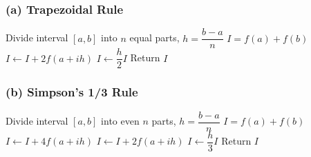 \subsubsection*{(a) Trapezoidal Rule}
\begin{algorithm}[H]
\caption{Trapezoidal Rule}
\begin{algorithmic}[1]
\STATE Divide interval $[a,b]$ into $n$ equal parts, $h=\dfrac{b-a}{n}$
\STATE $I = f(a) + f(b)$
    \STATE $I \gets I + 2f(a+ih)$
\ENDFOR
\STATE $I \gets \dfrac{h}{2} I$
\STATE Return $I$
\end{algorithmic}
\end{algorithm}

\subsubsection*{(b) Simpson’s 1/3 Rule}
\begin{algorithm}[H]
\caption{Simpson’s 1/3 Rule}
\begin{algorithmic}[1]
\STATE Divide interval $[a,b]$ into even $n$ parts, $h=\dfrac{b-a}{n}$
\STATE $I = f(a) + f(b)$
        \STATE $I \gets I + 4f(a+ih)$
    \ELSE
        \STATE $I \gets I + 2f(a+ih)$
    \ENDIF
\ENDFOR
\STATE $I \gets \dfrac{h}{3} I$
\STATE Return $I$
\end{algorithmic}
\end{algorithm}